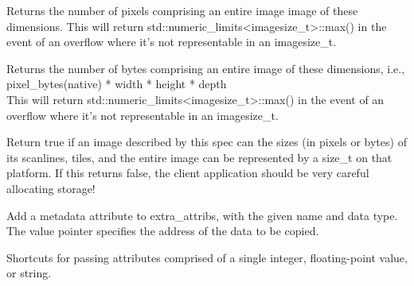Returns the number of pixels comprising an entire image image of these dimensions.
This will return {\cf std::numeric_limits<imagesize_t>::max()} in the event
of an overflow where it's not representable in an {\cf imagesize_t}.
\apiend

Returns the number of bytes comprising an entire image of these
dimensions, i.e., \\
{\cf pixel_bytes(native) * width * height * depth } \\
This will return {\cf std::numeric_limits<imagesize_t>::max()} in the event
of an overflow where it's not representable in an {\cf imagesize_t}.
\apiend

Return {\cf true} if an image described by this spec can the sizes
(in pixels or bytes) of its scanlines, tiles, and the entire image can
be represented by a {\cf size_t} on that platform.  If this returns
{\cf false}, the client application should be very careful allocating
storage!
\apiend


Add a metadata attribute to {\cf extra_attribs}, with the given name and
data type.  The {\cf value} pointer specifies
the address of the data to be copied.
\apiend

Shortcuts for passing attributes comprised of a single integer,
floating-point value, or string.
\apiend


